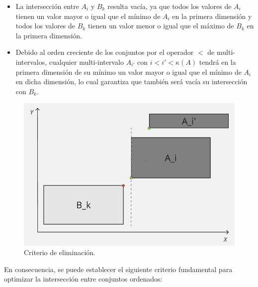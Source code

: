 \begin{itemize}
     \item La intersección entre $A_i$ y $B_k$ resulta vacía, ya que todos los valores de $A_i$ tienen un valor mayor o igual que el mínimo de $A_i$ en la primera dimensión y todos los valores de $B_k$ tienen un valor menor o igual que el máximo de $B_k$ en la primera dimensión.

    \item Debido al orden creciente de los conjuntos por el operador $<$ de multi-intervalos, cualquier multi-intervalo $A_{i'}$ con $i < i' < \kappa(A)$ tendrá en la primera dimensión de su mínimo un valor mayor o igual que el mínimo de $A_i$ en dicha dimensión, lo cual garantiza que también será vacía su intersección con $B_k$.
\end{itemize}

\begin{figure}[h]
    \centering
    \includegraphics[width=0.75\linewidth]{figures/Optimazaciones/Interseccion/criterio de elim.png}
    \caption{Criterio de eliminación.}
    \label{fig:criterio-eliminacion}
\end{figure}

En consecuencia, se puede establecer el siguiente criterio fundamental para optimizar la intersección entre conjuntos ordenados:


